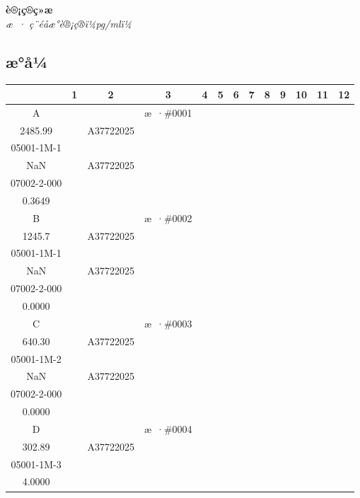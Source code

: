\documentclass[UTF8,10pt,a4paper,fontset=fandol]{ctexart}
\newcommand{\fieldvalue}[1]{#1}
\begin{document}
\textbf{è®¡ç®ç»æ}\\
\textit{æ · ç¨éåæ°è®¡ç®ï¼pg/mlï¼}

\subsection{æ°å¼}

\begin{tabular}{c|*{12}{c|}}
 &1&2&3&4&5&6&7&8&9&10&11&12\\ \hline
A&&&%
\fieldvalue{\scriptsize æ ·\#0001\\2485.99}&
&%
\fieldvalue{\scriptsize A37722025\\05001-1M-1\\NaN}&
&%
\fieldvalue{\scriptsize A37722025\\07002-2-000\\0.3649}&
&&&&\\ \hline
B&&&%
\fieldvalue{\scriptsize æ ·\#0002\\1245.7}&
&%
\fieldvalue{\scriptsize A37722025\\05001-1M-1\\NaN}&
&%
\fieldvalue{\scriptsize A37722025\\07002-2-000\\0.0000}&
&&&&\\ \hline
C&&&%
\fieldvalue{\scriptsize æ ·\#0003\\640.30}&
&%
\fieldvalue{\scriptsize A37722025\\05001-1M-2\\NaN}&
&%
\fieldvalue{\scriptsize A37722025\\07002-2-000\\0.0000}&
&&&&\\ \hline
D&&&%
\fieldvalue{\scriptsize æ ·\#0004\\302.89}&
&%
\fieldvalue{\scriptsize A37722025\\05001-1M-3\\4.0000}&

\end{tabular}
\end{document}
